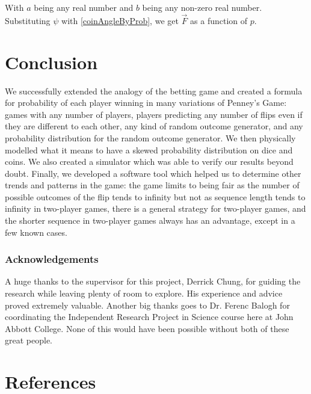 \documentclass[english,12pt,a4paper,final]{article}
\begin{document}
With $a$ being any real number and $b$ being any non-zero real number. Substituting $\psi$ with \eqref{coinAngleByProb}, we get $\vec{F}$ as a function of $p$.

\part {Conclusion}

We successfully extended the analogy of the betting game and created a formula for probability of each player winning in many variations of Penney's Game: games with any number of players, players predicting any number of flips even if they are different to each other, any kind of random outcome generator, and any probability distribution for the random outcome generator. We then physically modelled what it means to have a skewed probability distribution on dice and coins. We also created a simulator which was able to verify our results beyond doubt. Finally, we developed a software tool which helped us to determine other trends and patterns in the game: the game limits to being fair as the number of possible outcomes of the flip tends to infinity but not as sequence length tends to infinity in two-player games, there is a general strategy for two-player games, and the shorter sequence in two-player games always has an advantage, except in a few known cases.

\section{Acknowledgements}

A huge thanks to the supervisor for this project, Derrick Chung, for guiding the research while leaving plenty of room to explore. His experience and advice proved extremely valuable. Another big thanks goes to Dr. Ferenc Balogh for coordinating the Independent Research Project in Science course here at John Abbott College. None of this would have been possible without both of these great people.

\part {References}
\printbibliography[heading=none]
\end{document}
